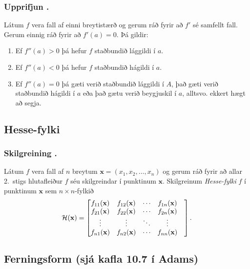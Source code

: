 \subsubsection{Upprifjun \kaflanr.}
 Látum $f$ vera fall af einni breytistærð og
gerum ráð fyrir að $f'$ sé samfellt fall.  Gerum einnig ráð fyrir að
$f'(a)=0$.  Þá gildir: 

\begin {enumerate}
 \item Ef $f''(a)>0$ þá hefur $f$ staðbundið lággildi í $a$.
 \item  Ef $f''(a)<0$ þá hefur $f$ staðbundið hágildi í $a$.
 \item  Ef $f''(a)=0$ þá gæti verið staðbundið lággildi í $A$, það gæti
     verið staðbundið hágildi í $a$ eða það gætu verið beygjuskil í
     $a$, alltsvo. ekkert hægt að segja. 
 \end {enumerate}






\subsection{Hesse-fylki} 

\subsubsection{Skilgreining \kaflanr.}
Látum $f$ vera fall af $n$ breytum $\mathbf{x} = (x_1,x_2,\ldots,x_n)$ og
gerum ráð fyrir að allar 2.~stigs hlutafleiður $f$ séu skilgreindar í
punktinum $\mathbf{x}$.  Skilgreinum  {\em \color{red} Hesse-fylki} $f$ í punktinum
$\mathbf{x}$ sem $n\times n$-fylkið
$${\cal H}(\mathbf{x})=\begin{bmatrix} f_{11}(\mathbf{x})&f_{12}(\mathbf{x}) & \cdots & f_{1n}(\mathbf{x})\\
 f_{21}(\mathbf{x})&f_{22}(\mathbf{x}) & \cdots & f_{2n}(\mathbf{x}) \\
 \vdots & \vdots & \ddots & \vdots & \\
  f_{n1}(\mathbf{x})&f_{n2}(\mathbf{x}) & \cdots & f_{nn}(\mathbf{x})\end{bmatrix}.$$





\subsection{Ferningsform (sjá kafla 10.7 í Adams)} 

